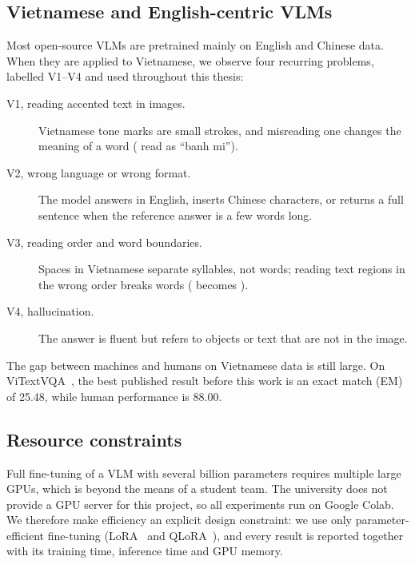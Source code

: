 \subsection{Vietnamese and English-centric VLMs}

Most open-source VLMs are pretrained mainly on English and Chinese data. When
they are applied to Vietnamese, we observe four recurring problems, labelled
V1--V4 and used throughout this thesis:

\begin{description}
  \item[V1, reading accented text in images.] Vietnamese tone marks are small
  strokes, and misreading one changes the meaning of a word
  ( read as ``banh mi'').
  \item[V2, wrong language or wrong format.] The model answers in English,
  inserts Chinese characters, or returns a full sentence when the reference
  answer is a few words long.
  \item[V3, reading order and word boundaries.] Spaces in Vietnamese separate
  syllables, not words; reading text regions in the wrong order breaks words
  ( becomes ).
  \item[V4, hallucination.] The answer is fluent but refers to objects or text
  that are not in the image.
\end{description}

The gap between machines and humans on Vietnamese data is still large. On
ViTextVQA~\cite{nguyen2024vitextvqa}, the best published result before this work
is an exact match (EM) of 25.48, while human performance is 88.00.

\subsection{Resource constraints}

Full fine-tuning of a VLM with several billion parameters requires multiple
large GPUs, which is beyond the means of a student team. The university does
not provide a GPU server for this project, so all experiments run on Google
Colab. We therefore make efficiency an explicit design constraint: we use only
parameter-efficient fine-tuning (LoRA~\cite{hu2022lora} and
QLoRA~\cite{dettmers2023qlora}), and every result is reported together with its
training time, inference time and GPU memory.

